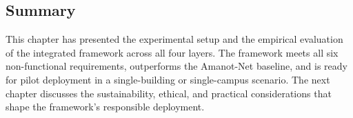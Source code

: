 \subsection{Summary}

This chapter has presented the experimental setup and the empirical evaluation of the integrated framework across all four layers. The framework meets all six non-functional requirements, outperforms the Amanot-Net baseline, and is ready for pilot deployment in a single-building or single-campus scenario. The next chapter discusses the sustainability, ethical, and practical considerations that shape the framework's responsible deployment.
